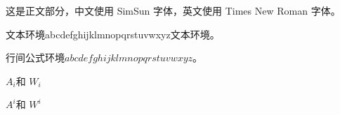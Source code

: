 \documentclass{article}
\begin{document}
这是正文部分，中文使用 SimSun 字体，英文使用 Times New Roman 字体。

文本环境abcdefghijklmnopqrstuvwxyz文本环境。


行间公式环境${abcdefghijklmnopqrstuvwxyz}$。

$A_i$和 $W_i$

$A^i$和 $W^i$






\end{document}
